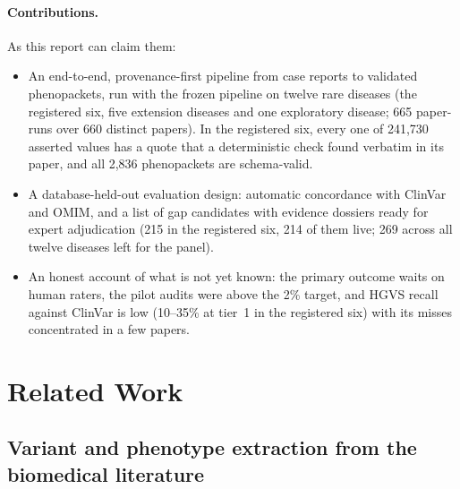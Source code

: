 \documentclass{article} %
\begin{document}
\paragraph{Contributions.} As this report can claim them:
\begin{itemize}
\item An end-to-end, provenance-first pipeline from case reports to validated phenopackets, run with the frozen pipeline on twelve rare diseases (the registered six, five extension diseases and one exploratory disease; 665 paper-runs over 660 distinct papers). In the registered six, every one of 241,730 asserted values has a quote that a deterministic check found verbatim in its paper, and all 2,836 phenopackets are schema-valid.
\item A database-held-out evaluation design: automatic concordance with ClinVar and OMIM, and a list of gap candidates with evidence dossiers ready for expert adjudication (215 in the registered six, 214 of them live; 269 across all twelve diseases left for the panel).
\item An honest account of what is not yet known: the primary outcome waits on human raters, the pilot audits were above the 2\% target, and HGVS recall against ClinVar is low (10--35\% at tier~1 in the registered six) with its misses concentrated in a few papers.
\end{itemize}

\section{Related Work}
\label{sec:related_work}
\subsection{Variant and phenotype extraction from the biomedical literature}
\end{document}
